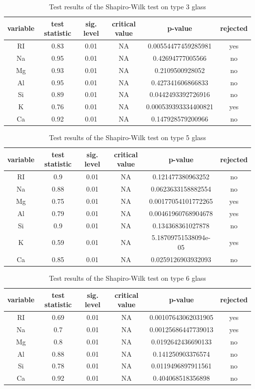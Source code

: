 \documentclass[a4paper, 12pt, titlepage, headsepline, listof = totoc, bibliography = totoc, numbers = noenddot]{scrartcl}
\begin{document}
\begin{table}[h!]
\centering
\begin{tabular}{|cccccc|} \hline variable & test statistic & sig. level & critical value & p-value & rejected\\ \hline RI & 0.83 & 0.01 & NA & 0.00554477459285981 & yes\\ 
Na & 0.95 & 0.01 & NA & 0.42694777005566 & no\\ 
Mg & 0.93 & 0.01 & NA & 0.2109500928052 & no\\ 
Al & 0.95 & 0.01 & NA & 0.427341606866833 & no\\ 
Si & 0.89 & 0.01 & NA & 0.0442493392726916 & no\\ 
K & 0.76 & 0.01 & NA & 0.000539393334400821 & yes\\ 
Ca & 0.92 & 0.01 & NA & 0.147928579200966 & no\\ \hline \end{tabular}\caption{Test results of the Shapiro-Wilk test on type 3 glass}
\label{tab:testrestype3SW}
\end{table}

\begin{table}[h!]
\centering
\begin{tabular}{|cccccc|} \hline variable & test statistic & sig. level & critical value & p-value & rejected\\ \hline RI & 0.9 & 0.01 & NA & 0.121477380963252 & no\\ 
Na & 0.88 & 0.01 & NA & 0.0623633158882554 & no\\ 
Mg & 0.75 & 0.01 & NA & 0.00177054101772265 & yes\\ 
Al & 0.79 & 0.01 & NA & 0.00461960768904678 & yes\\ 
Si & 0.9 & 0.01 & NA & 0.134368361027878 & no\\ 
K & 0.59 & 0.01 & NA & 5.18709751538094e-05 & yes\\ 
Ca & 0.85 & 0.01 & NA & 0.0259126903932093 & no\\ \hline \end{tabular}\caption{Test results of the Shapiro-Wilk test on type 5 glass}
\label{tab:testrestype5SW}
\end{table}

\begin{table}[h!]
\centering
\begin{tabular}{|cccccc|} \hline variable & test statistic & sig. level & critical value & p-value & rejected\\ \hline RI & 0.69 & 0.01 & NA & 0.00107643062031905 & yes\\ 
Na & 0.7 & 0.01 & NA & 0.00125686447739013 & yes\\ 
Mg & 0.8 & 0.01 & NA & 0.0192642436690133 & no\\ 
Al & 0.88 & 0.01 & NA & 0.141250903376574 & no\\ 
Si & 0.78 & 0.01 & NA & 0.0119496897911561 & no\\ 
Ca & 0.92 & 0.01 & NA & 0.404068518356898 & no\\ \hline \end{tabular}\caption{Test results of the Shapiro-Wilk test on type 6 glass}
\label{tab:testrestype6SW}
\end{table}
\end{document}
